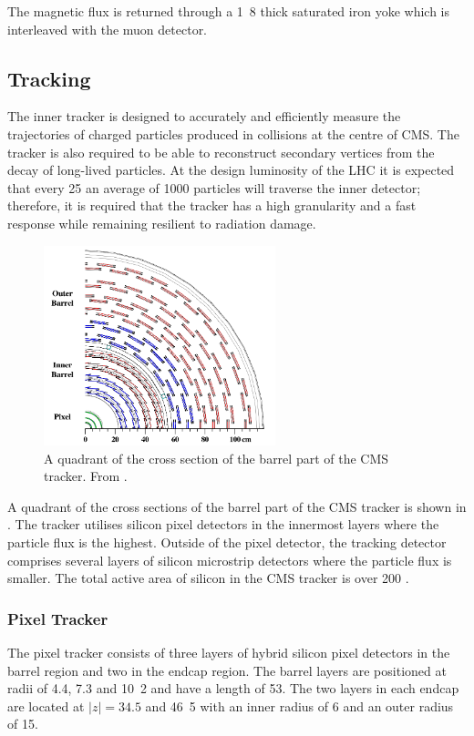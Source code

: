 The magnetic flux is returned through a \unit{1.8}{\meter} thick saturated iron
yoke which is interleaved with the muon detector.

\subsection{Tracking}
The inner tracker is designed to accurately and efficiently measure the
trajectories of charged particles produced in collisions at the centre of CMS.
The tracker is also required to be able to reconstruct secondary vertices from
the decay of long-lived particles.  At the design luminosity of the LHC it
is expected that every \unit{25}{\ns} an average of 1000 particles will traverse
the inner detector; therefore, it is required that the tracker has a high
granularity and a fast response while remaining resilient to radiation damage. 

\begin{figure}[htbp]
  \centering
  \includegraphics[width=0.6\textwidth]{tracker}
  \caption[A quadrant of the cross section of the barrel part of the {CMS}
tracker.]{A quadrant of the cross section of the barrel part of the {CMS}
tracker. From \cite{cmsgsf}.}
  \label{fig:tracker}
\end{figure}

A quadrant of the cross sections of the barrel part of the {CMS}
tracker is shown in .
The tracker utilises silicon pixel detectors in the innermost layers where the
particle flux is the highest.  Outside of the pixel detector, the tracking
detector comprises several layers of silicon microstrip detectors where the
particle flux is smaller.  The total active area of silicon in the CMS tracker
is over \unit{200}{\meter\squared} \cite{chatrchyan2008cms}.

\subsubsection{Pixel Tracker}
The pixel tracker consists of three layers of hybrid silicon pixel detectors in
the barrel region and two in the endcap region. 
The barrel layers are positioned at radii of 4.4, 7.3 and \unit{10.2}{\cm} and have
a length of \unit{53}{\cm}. The two layers in each endcap are located at
$|z|=34.5$ and \unit{46.5}{\cm} with an inner radius of \unit{6}{\cm} and an
outer radius of \unit{15}{\cm}.

